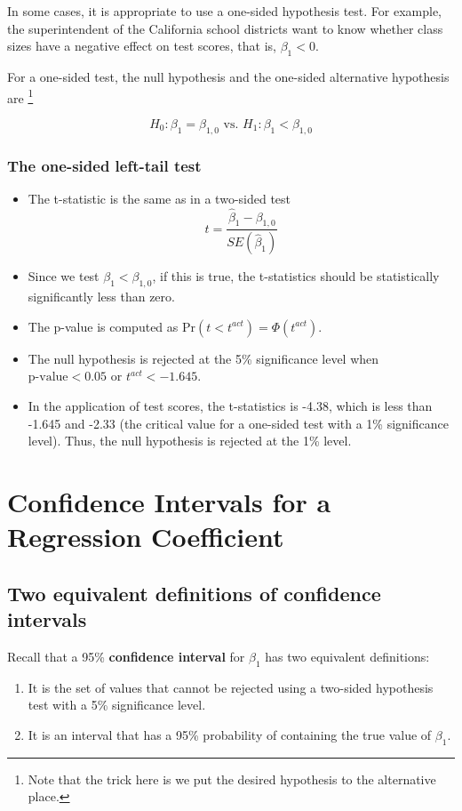 \documentclass[a4paper,11pt]{article}
\newcommand{\pr}{\mathrm{Pr}}
\begin{document}
In some cases, it is appropriate to use a one-sided hypothesis
test. For example, the superintendent of the California school
districts want to know whether class sizes have a negative effect on
test scores, that is, \(\beta_1 < 0\). 

For a one-sided test, the null hypothesis and the one-sided
alternative hypothesis are \footnote{Note that the trick here is we put the
desired hypothesis to the alternative place.}

\[ H_0: \beta_1 = \beta_{1,0} \text{ vs. } H_1: \beta_1 < \beta_{1,0} \]

\subsubsection*{The one-sided left-tail test}
\label{sec:org1c8b3b3}

\begin{itemize}
\item The t-statistic is the same as in a two-sided test
\[ t = \frac{\hat{\beta}_1 - \beta_{1,0}}{SE(\hat{\beta}_1)} \]
\item Since we test \(\beta_1 < \beta_{1,0}\), if this is true, the
t-statistics should be statistically significantly less than zero.
\item The p-value is computed as \(\pr(t < t^{act}) = \varPhi(t^{act})\).
\item The null hypothesis is rejected at the 5\% significance level when
\(\text{p-value} < 0.05\) or \(t^{act} < -1.645\).
\item In the application of test scores, the t-statistics is -4.38, which
is less than -1.645 and -2.33 (the critical value for a one-sided
test with a 1\% significance level). Thus, the null hypothesis is
rejected at the 1\% level.
\end{itemize}


\section{Confidence Intervals for a Regression Coefficient}
\label{sec:org6a72baa}

\subsection{Two equivalent definitions of confidence intervals}
\label{sec:org1b140eb}

Recall that a 95\% \textbf{confidence interval} for \(\beta_1\) has two equivalent
definitions:
\begin{enumerate}
\item It is the set of values that cannot be rejected using a two-sided
hypothesis test with a 5\% significance level.
\item It is an interval that has a 95\% probability of containing the true
value of \(\beta_1\).
\end{enumerate}
\end{document}
